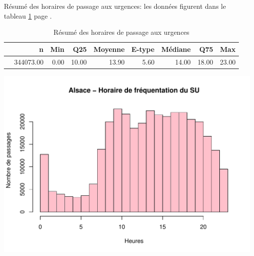 \documentclass[12pt,english,french,twoside]{book}\usepackage[]{graphicx}\usepackage[]{color}
\makeatletter
\def\maxwidth{ %
  \ifdim\Gin@nat@width>\linewidth
    \linewidth
  \else
    \Gin@nat@width
  \fi
}
\newenvironment{knitrout}{}{} %
\makeatother
\begin{document}
Résumé des horaires de passage aux urgences: les données figurent dans le tableau \ref{tab:24} page \pageref{tab:24}.
\begin{table}[ht]
\centering
\begin{tabular}{rrrrrrrrr}
  \hline
 & n & Min & Q25 & Moyenne & E-type & Médiane & Q75 & Max \\ 
  \hline
 & 344073.00 & 0.00 & 10.00 & 13.90 & 5.60 & 14.00 & 18.00 & 23.00 \\ 
   \hline
\end{tabular}
\caption[Horaires de passage]{Résumé des horaires de passage aux urgences} 
\label{tab:24}
\end{table}



% 

\begin{center}
\begin{knitrout}
\color{fgcolor}
\includegraphics[width=\maxwidth]{figure/test23} 

\end{knitrout}

\label{passage:als}
\end{center}

\end{document}
